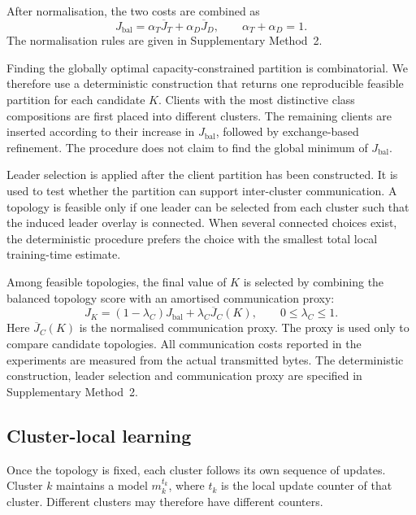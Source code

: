 \documentclass[pdflatex,sn-mathphys-num]{sn-jnl}
\begin{document}
After normalisation, the two costs are combined as
\begin{equation}
J_{\mathrm{bal}}
=
\alpha_T\overline{J}_T
+
\alpha_D\overline{J}_D,
\qquad
\alpha_T+\alpha_D=1 .
\label{eq:balanced_clustering_score}
\end{equation}
The normalisation rules are given in Supplementary Method~2.

Finding the globally optimal capacity-constrained partition is combinatorial. We therefore use a deterministic construction that returns one reproducible feasible partition for each candidate \(K\). Clients with the most distinctive class compositions are first placed into different clusters. The remaining clients are inserted according to their increase in \(J_{\mathrm{bal}}\), followed by exchange-based refinement. The procedure does not claim to find the global minimum of \(J_{\mathrm{bal}}\).

Leader selection is applied after the client partition has been constructed. It is used to test whether the partition can support inter-cluster communication. A topology is feasible only if one leader can be selected from each cluster such that the induced leader overlay is connected. When several connected choices exist, the deterministic procedure prefers the choice with the smallest total local training-time estimate.

Among feasible topologies, the final value of \(K\) is selected by combining the balanced topology score with an amortised communication proxy:
\begin{equation}
J_K
=
(1-\lambda_C)
J_{\mathrm{bal}}
+
\lambda_C
\overline{J}_C(K),
\qquad
0\leq\lambda_C\leq1 .
\label{eq:cluster_number_score}
\end{equation}
Here \(\overline{J}_C(K)\) is the normalised communication proxy. The proxy is used only to compare candidate topologies. All communication costs reported in the experiments are measured from the actual transmitted bytes. The deterministic construction, leader selection and communication proxy are specified in Supplementary Method~2.


\subsection{Cluster-local learning}
\label{subsec:cluster_local_learning}

Once the topology is fixed, each cluster follows its own sequence of updates. Cluster \(k\) maintains a model \(m_k^{t_k}\), where \(t_k\) is the local update counter of that cluster. Different clusters may therefore have different counters.
\end{document}
